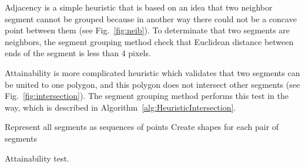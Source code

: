 \documentclass{lutmscthesis}[2010/09/22]
\begin{document}
Adjacency is a simple heuristic that is based on an idea that two neighbor segment cannot be grouped because in another way there could not be a concave point between them  (see Fig.~\ref{fig:neib}). To determinate that two segments are neighbors, the segment grouping method check that Euclidean distance between ends of the segment is less than 4 pixels.

Attainability is more complicated heuristic which validates that two segments can be united to one polygon, and this polygon does not intersect other segments (see Fig.~\ref{fig:intersection}). The segment grouping method performs this test in the way, which is described in Algorithm~\ref{alg:HeuristicIntersection}.


\begin{algorithm} [H]
    \SetAlgoLined
    Represent all segments as sequences of points\;
    Create shapes for each pair of segments\;
    
\caption{Attainability test.}\label{alg:HeuristicIntersection}
\end{algorithm}



\begin{figure}[htp]
\end{figure}


\begin{figure}[htp]
\end{figure}
\end{document}
